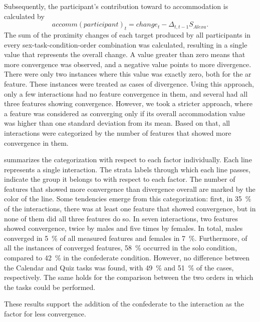Subsequently, the participant's contribution toward to accommodation is calculated by
%
\begin{equation}
\label{eq:accommodation}
accomm(participant)_t = change_t - \Delta_{t, t-1} S_{Alexa}.
\end{equation}
%
The sum of the proximity changes of each target produced by all participants in every sex-task-condition-order combination was calculated, resulting in a single value that represents the overall change.
A value greater than zero means that more convergence was observed, and a negative value points to more divergence.
There were only two instances where this value was exactly zero, both for the \ac{ar} feature.
These instances were treated as cases of divergence.
Using this approach, only a few interactions had no feature convergence in them, and several had all three features showing convergence.
However, we took a stricter approach, where a feature was considered as converging only if its overall accommodation value was higher than one standard deviation from its mean.
Based on that, all interactions were categorized by the number of features that showed more convergence in them.

 summarizes the categorization with respect to each factor individually.
Each line represents a single interaction.
The strata labels through which each line passes, indicate the group it belongs to with respect to each factor.
The number of features that showed more convergence than divergence overall are marked by the color of the line.
Some tendencies emerge from this categorization:
first, in \SI{35}{\percent} of the interactions, there was at least one feature that showed convergence, but in none of them did all three features do so.
In seven interactions, two features showed convergence, twice by males and five times by females.
In total, males converged in \SI{5}{\percent} of all measured features and females in \SI{7}{\percent}.
Furthermore, of all the instances of converged features, \SI{58}{\percent} occurred in the solo condition, compared to \SI{42}{\percent} in the confederate condition.
However, no difference between the Calendar and Quiz tasks was found, with \SI{49}{\percent} and \SI{51}{\percent} of the cases, respectively.
The same holds for the comparison between the two orders in which the tasks could be performed.

These results support the addition of the confederate to the interaction as the factor for less convergence.

